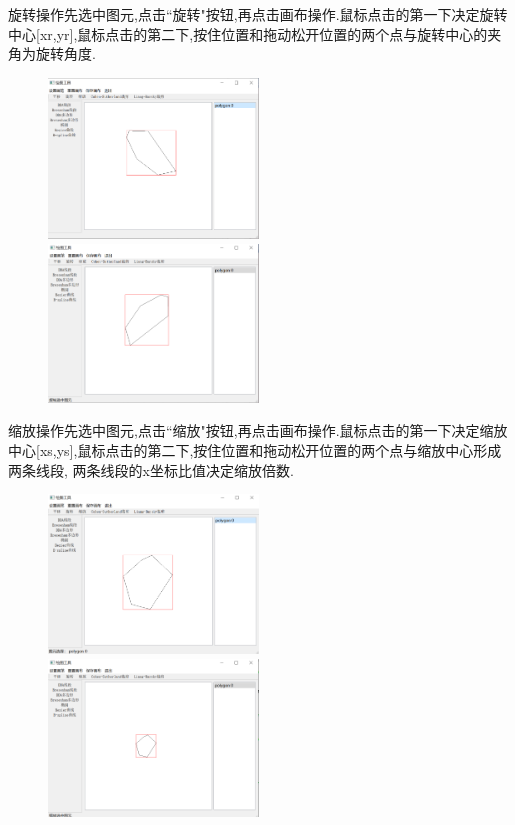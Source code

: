 \documentclass[a4paper,UTF8]{article}
\theoremstyle{definition}
\begin{document}
旋转操作先选中图元,点击``旋转"按钮,再点击画布操作.鼠标点击的第一下决定旋转中心[xr,yr],鼠标点击的第二下,按住位置和拖动松开位置的两个点与旋转中心的夹角为旋转角度.
\begin{figure}[H]
	\centering
	\begin{minipage}[t]{0.5\linewidth}
		\includegraphics[width=2.2in]{rotate1.png}
	\end{minipage}%
	\begin{minipage}[t]{0.5\linewidth}
		\includegraphics[width=2.2in]{rotate2.png}
	\end{minipage}
\end{figure}
缩放操作先选中图元,点击``缩放"按钮,再点击画布操作.鼠标点击的第一下决定缩放中心[xs,ys],鼠标点击的第二下,按住位置和拖动松开位置的两个点与缩放中心形成两条线段, 两条线段的x坐标比值决定缩放倍数.
\begin{figure}[H]
	\centering
	\begin{minipage}[t]{0.5\linewidth}
		\includegraphics[width=2.2in]{scale1.png}
	\end{minipage}%
	\begin{minipage}[t]{0.5\linewidth}
		\includegraphics[width=2.2in]{scale2.png}
	\end{minipage}
\end{figure}
\end{document}
